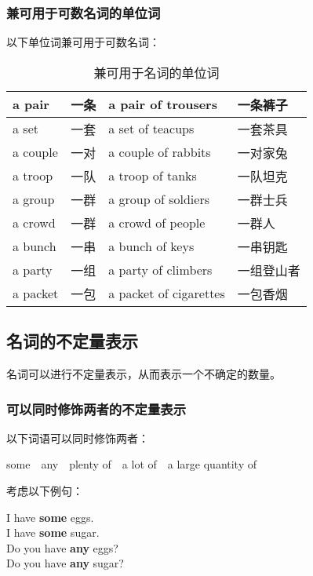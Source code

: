 \documentclass[UTF8]{ctexart}
\begin{document}
\subsubsection{兼可用于可数名词的单位词}
    以下单位词兼可用于可数名词：
    \begin{table}[h]
        \begin{center}
            \ttfamily
            \begin{tabular}{p{70pt}|p{50pt}|p{150pt}|p{60pt}}
                \hline
                a pair&一条&a pair of trousers&一条裤子\\ \hline
                a set&一套&a set of teacups&一套茶具\\ \hline
                a couple&一对&a couple of rabbits&一对家兔\\ \hline
                a troop&一队&a troop of tanks&一队坦克\\ \hline
                a group&一群&a group of soldiers&一群士兵\\ \hline
                a crowd&一群&a crowd of people&一群人\\ \hline
                a bunch&一串&a bunch of keys&一串钥匙\\ \hline
                a party&一组&a party of climbers&一组登山者\\ \hline
                a packet&一包&a packet of cigarettes&一包香烟\\ \hline
            \end{tabular}
            \rmfamily
            \caption{兼可用于名词的单位词}
        \end{center}
    \end{table}\vspace{-25pt}

\newpage

\subsection{名词的不定量表示}
    名词可以进行不定量表示，从而表示一个不确定的数量。

\subsubsection{可以同时修饰两者的不定量表示}
    以下词语可以同时修饰两者：
    \begin{center}
        \ttfamily
        some~~any~~plenty of~~a lot of~~a large quantity of\\[6mm]
    \end{center}
    考虑以下例句：
    \begin{center}
        \large\ttfamily
        I have \textbf{some} eggs.\\[3mm]
        I have \textbf{some} sugar.\\[3mm]
        Do you have \textbf{any} eggs?\\[3mm]
        Do you have \textbf{any} sugar?
    \end{center}\vspace{5pt}
\end{document}
